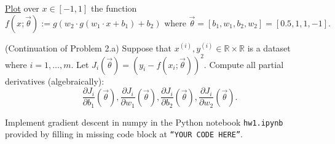 \documentclass[
	number={1}
]{cs577homework}
\begin{document}
\problemline

\underline{Plot} over $x \in [-1, 1]$ the function
\[ f(x; \vec{\theta}) := g\left( w_{2} \cdot g(w_{1}\cdot x + b_{1}) + b_{2} \right) \text{  where  } \vec{\theta} = [b_{1}, w_{1}, b_{2}, w_{2}] = [0.5, 1, 1, -1]. \]

\problemline

(Continuation of Problem 2.a)
Suppose that $x^{(i)}, y^{(i)} \in \mathbb{R} \times \mathbb{R}$ is a dataset where $i = 1, \dots, m$.
Let $J_{i}(\vec{\theta}) = \left( y_{i} - f(x_{i}; \vec{\theta}) \right)^{2}.$
Compute all partial derivatives (algebraically):
\[
	\frac{\partial J_{i}}{\partial b_{1}} (\vec{\theta}),
	\frac{\partial J_{i}}{\partial w_{1}} (\vec{\theta}),
	\frac{\partial J_{i}}{\partial b_{2}} (\vec{\theta}),
	\frac{\partial J_{i}}{\partial w_{2}} (\vec{\theta}).
\]

\problemline

Implement gradient descent in numpy in the Python notebook \texttt{hw1.ipynb} provided by filling in missing code block at \texttt{``YOUR CODE HERE''}.
\end{document}
